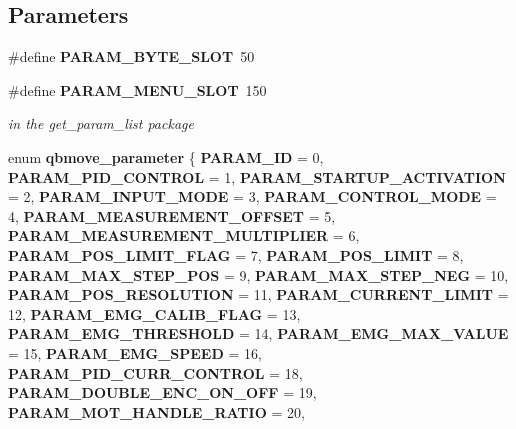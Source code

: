 \subsection*{Parameters}
\begin{DoxyCompactItemize}
\item 
\#define \textbf{ P\+A\+R\+A\+M\+\_\+\+B\+Y\+T\+E\+\_\+\+S\+L\+OT}~50
\item 
\#define \textbf{ P\+A\+R\+A\+M\+\_\+\+M\+E\+N\+U\+\_\+\+S\+L\+OT}~150
\begin{DoxyCompactList}\small\item\em in the get\+\_\+param\+\_\+list package \end{DoxyCompactList}\item 
enum \textbf{ qbmove\+\_\+parameter} \{ \newline
\textbf{ P\+A\+R\+A\+M\+\_\+\+ID} = 0, 
\textbf{ P\+A\+R\+A\+M\+\_\+\+P\+I\+D\+\_\+\+C\+O\+N\+T\+R\+OL} = 1, 
\textbf{ P\+A\+R\+A\+M\+\_\+\+S\+T\+A\+R\+T\+U\+P\+\_\+\+A\+C\+T\+I\+V\+A\+T\+I\+ON} = 2, 
\textbf{ P\+A\+R\+A\+M\+\_\+\+I\+N\+P\+U\+T\+\_\+\+M\+O\+DE} = 3, 
\newline
\textbf{ P\+A\+R\+A\+M\+\_\+\+C\+O\+N\+T\+R\+O\+L\+\_\+\+M\+O\+DE} = 4, 
\textbf{ P\+A\+R\+A\+M\+\_\+\+M\+E\+A\+S\+U\+R\+E\+M\+E\+N\+T\+\_\+\+O\+F\+F\+S\+ET} = 5, 
\textbf{ P\+A\+R\+A\+M\+\_\+\+M\+E\+A\+S\+U\+R\+E\+M\+E\+N\+T\+\_\+\+M\+U\+L\+T\+I\+P\+L\+I\+ER} = 6, 
\textbf{ P\+A\+R\+A\+M\+\_\+\+P\+O\+S\+\_\+\+L\+I\+M\+I\+T\+\_\+\+F\+L\+AG} = 7, 
\newline
\textbf{ P\+A\+R\+A\+M\+\_\+\+P\+O\+S\+\_\+\+L\+I\+M\+IT} = 8, 
\textbf{ P\+A\+R\+A\+M\+\_\+\+M\+A\+X\+\_\+\+S\+T\+E\+P\+\_\+\+P\+OS} = 9, 
\textbf{ P\+A\+R\+A\+M\+\_\+\+M\+A\+X\+\_\+\+S\+T\+E\+P\+\_\+\+N\+EG} = 10, 
\textbf{ P\+A\+R\+A\+M\+\_\+\+P\+O\+S\+\_\+\+R\+E\+S\+O\+L\+U\+T\+I\+ON} = 11, 
\newline
\textbf{ P\+A\+R\+A\+M\+\_\+\+C\+U\+R\+R\+E\+N\+T\+\_\+\+L\+I\+M\+IT} = 12, 
\textbf{ P\+A\+R\+A\+M\+\_\+\+E\+M\+G\+\_\+\+C\+A\+L\+I\+B\+\_\+\+F\+L\+AG} = 13, 
\textbf{ P\+A\+R\+A\+M\+\_\+\+E\+M\+G\+\_\+\+T\+H\+R\+E\+S\+H\+O\+LD} = 14, 
\textbf{ P\+A\+R\+A\+M\+\_\+\+E\+M\+G\+\_\+\+M\+A\+X\+\_\+\+V\+A\+L\+UE} = 15, 
\newline
\textbf{ P\+A\+R\+A\+M\+\_\+\+E\+M\+G\+\_\+\+S\+P\+E\+ED} = 16, 
\textbf{ P\+A\+R\+A\+M\+\_\+\+P\+I\+D\+\_\+\+C\+U\+R\+R\+\_\+\+C\+O\+N\+T\+R\+OL} = 18, 
\textbf{ P\+A\+R\+A\+M\+\_\+\+D\+O\+U\+B\+L\+E\+\_\+\+E\+N\+C\+\_\+\+O\+N\+\_\+\+O\+FF} = 19, 
\textbf{ P\+A\+R\+A\+M\+\_\+\+M\+O\+T\+\_\+\+H\+A\+N\+D\+L\+E\+\_\+\+R\+A\+T\+IO} = 20, 

\end{DoxyCompactItemize}
